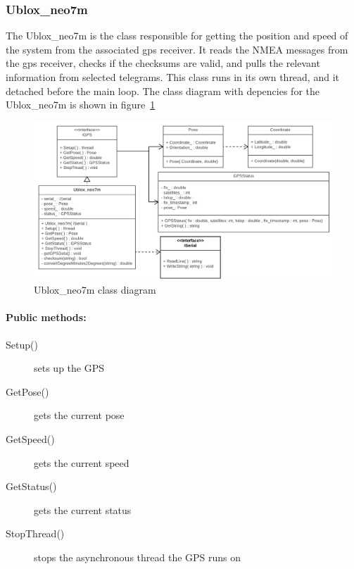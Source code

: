 \subsubsection{Ublox_neo7m}

The Ublox_neo7m is the class responsible for getting the position and speed of the system from the associated gps receiver. It reads the NMEA messages from the gps receiver, checks if the checksums are valid, and pulls the relevant information from selected telegrams. This class runs in its own thread, and it detached before the main loop. The class diagram with depencies for the Ublox_neo7m is shown in figure~\ref{fig:ubloxneo7m}

\begin{figure}[H]
\centering
\includegraphics[width=1\linewidth]{Images/Design/ubloxNEO7M_class_diagram}
\caption{Ublox_neo7m class diagram}
\label{fig:ubloxneo7m}
\end{figure}

\paragraph{Public methods:}
\begin{adjustwidth}{2.5em}{0pt}\begin{description}
		\item [Setup()] sets up the GPS
		\item [GetPose()] gets the current pose
		\item [GetSpeed()] gets the current speed
		\item [GetStatus()] gets the current status
		\item [StopThread()] stops the asynchronous thread the GPS runs on
\end{description}\end{adjustwidth}

